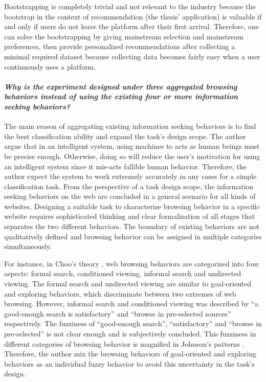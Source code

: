 Bootstrapping is completely trivial and not relevant to the industry 
because the bootstrap in the context of recommendation (the thesis' application) is valuable if and only if
users do not leave the platform after their first arrival. Therefore, one can solve
the bootstrapping by giving mainstream selection and mainstream preferences, then provide
personalized recommendations after collecting a minimal required dataset because 
collecting data becomes fairly easy when a user continuously uses a platform.

\paragraph{\emph{Why is the experiment designed under three aggregated browsing behaviors instead of
using the existing four or more information seeking behaviors?}}

The main reason of aggregating existing information seeking behaviors is to find the best 
classification ability and expand the task's design scope.
The author argue that in an intelligent system, using machines to acts as human beings must be 
precise enough. Otherwise, doing so will reduce the user's motivation for using 
an intelligent system since it mis-acts fallible human behavior. 
Therefore, the author expect the system to work extremely accurately in any cases 
for a simple classification task.
From the perspective of a task design scope, 
the information seeking behaviors on the web 
are concluded in a general scenario for all kinds of websites. 
Designing a suitable task to characterize browsing behavior 
in a specific website requires sophisticated thinking 
and clear formalization of all stages that separates the two different behaviors.
The boundary of existing behaviors are not qualitatively defined and browsing behavior
can be assigned in multiple categories simultaneously.

For instance, in Choo's theory \cite{choo1999information}, web browsing behaviors 
are categorized into four aspects:
formal search, conditioned viewing, informal search and undirected viewing.
The formal search and undirected viewing are similar to goal-oriented and exploring behaviors,
which discriminate between two extremes of web browsing.
However, informal search and conditioned viewing was described by
``a good-enough search is satisfactory'' and ``browse in pre-selected sources'' respectively.
The fuzziness of ``good-enough search'', ``satisfactory'' and ``browse in pre-selected''
is not clear enough and is subjectively concluded. 
This fuzziness in different categories of browsing
behavior is magnified in Johnson's patterns \cite{johnson2017patterns}.
Therefore, the author mix the browsing behaviors
of goal-oriented and exploring behaviors as an individual fuzzy behavior
to avoid this uncertainty in the task's design.

